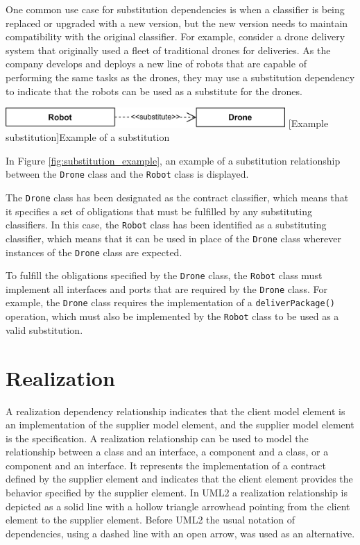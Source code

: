 \documentclass[
	12pt,
    a4paper,
    egregdoesnotlikesansseriftitles, %
    toc=chapterentrywithdots,
    oneside, openany,
    titlepage,
    parskip=half,
    headings=normal,  %
    listof=totoc,
    bibliography=totoc,
    index=totoc,
    captions=tableheading,  %
    listof=flat,
    numbers=noenddot, %
    final]
    {scrbook}
\begin{document}
One common use case for substitution dependencies is when a classifier is being replaced or upgraded with a new version, but the new version needs to maintain compatibility with the original classifier. For example, consider a drone delivery system that originally used a fleet of traditional drones for deliveries. As the company develops and deploys a new line of robots that are capable of performing the same tasks as the drones, they may use a substitution dependency to indicate that the robots can be used as a substitute for the drones.


\vspace{1em}
\begin{minipage}{\linewidth}
	\centering
	\includegraphics[width=0.8\textwidth]{figures/dependencies/substitute.jpg}
	[Example substitution]{Example of a substitution}
	\label{fig:substitution_example}
\end{minipage}
\vspace{1em}


In Figure \ref{fig:substitution_example}, an example of a substitution relationship between the \texttt{Drone} class and the \texttt{Robot} class is displayed.

The \texttt{Drone} class has been designated as the contract classifier, which means that it specifies a set of obligations that must be fulfilled by any substituting classifiers. In this case, the \texttt{Robot} class has been identified as a substituting classifier, which means that it can be used in place of the \texttt{Drone} class wherever instances of the \texttt{Drone} class are expected.

To fulfill the obligations specified by the \texttt{Drone} class, the \texttt{Robot} class must implement all interfaces and ports that are required by the \texttt{Drone} class. For example, the \texttt{Drone} class requires the implementation of a \texttt{deliverPackage()} operation, which must also be implemented by the \texttt{Robot} class to be used as a valid substitution.


\section{Realization}
A realization dependency relationship indicates that the client model element is an implementation of the supplier model element, and the supplier model element is the specification.
A realization relationship can be used to model the relationship between a class and an interface, a component and a class, or a component and an interface. 
It represents the implementation of a contract defined by the supplier element and indicates that the client element provides the behavior specified by the supplier element.
In UML2 a realization relationship is depicted as a solid line with a hollow triangle arrowhead pointing from the client element to the supplier element.
Before UML2 the usual notation of dependencies, using a dashed line with an open arrow, was used as an alternative. \cite[p. 164]{uml}
\end{document}
